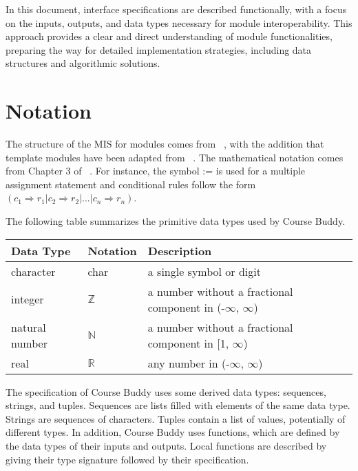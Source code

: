 \documentclass[12pt, titlepage]{article}
\begin{document}
In this document, interface specifications are described functionally, with a focus on the inputs, outputs, and data types necessary for module interoperability. This approach provides a clear and direct understanding of module functionalities, preparing the way for detailed implementation strategies, including data structures and algorithmic solutions.


\section{Notation}

The structure of the MIS for modules comes from ~\citet{HoffmanAndStrooper1995},
with the addition that template modules have been adapted from
~\citet{GhezziEtAl2003}.  The mathematical notation comes from Chapter 3 of
~\citet{HoffmanAndStrooper1995}.  For instance, the symbol := is used for a
multiple assignment statement and conditional rules follow the form $(c_1
\Rightarrow r_1 | c_2 \Rightarrow r_2 | ... | c_n \Rightarrow r_n )$.

The following table summarizes the primitive data types used by Course Buddy. 

\begin{center}
\renewcommand{\arraystretch}{1.2}
\noindent 
\begin{tabular}{l l p{7.5cm}} 
\toprule 
\textbf{Data Type} & \textbf{Notation} & \textbf{Description}\\ 
\midrule
character & char & a single symbol or digit\\
integer & $\mathbb{Z}$ & a number without a fractional component in (-$\infty$, $\infty$) \\
natural number & $\mathbb{N}$ & a number without a fractional component in [1, $\infty$) \\
real & $\mathbb{R}$ & any number in (-$\infty$, $\infty$)\\
\bottomrule
\end{tabular} 
\end{center}

\noindent
The specification of Course Buddy uses some derived data types: sequences, strings, and
tuples. Sequences are lists filled with elements of the same data type. Strings
are sequences of characters. Tuples contain a list of values, potentially of
different types. In addition, Course Buddy uses functions, which
are defined by the data types of their inputs and outputs. Local functions are
described by giving their type signature followed by their specification.
\end{document}
